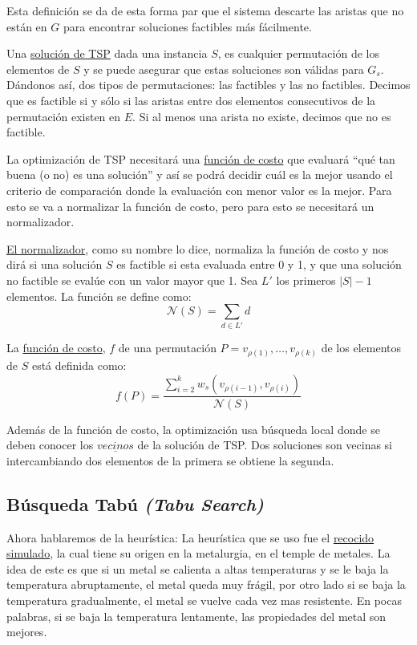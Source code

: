 \documentclass{article}
\begin{document}
Esta definición se da de esta forma par que el sistema descarte las aristas que no están en $G$ para encontrar soluciones factibles más fácilmente.

Una \underline{solución de TSP} dada una instancia $S$, es cualquier permutación de los elementos de $S$ y se puede asegurar que estas soluciones son válidas para $G_s$. Dándonos así, dos tipos de permutaciones: las factibles y las no factibles. Decimos que es factible si y sólo si las aristas entre dos elementos consecutivos de la permutación existen en $E$. Si al menos una arista no existe, decimos que no es factible.


La optimización de TSP necesitará una \underline{función de costo} que evaluará ``qué tan buena (o no) es una solución'' y así se podrá decidir cuál es la mejor usando el criterio de comparación donde la evaluación con menor valor es la mejor. Para esto se va a normalizar la función de costo, pero para esto se necesitará un normalizador.

\underline{El normalizador}, como su nombre lo dice, normaliza la función de costo y nos dirá si una solución $S$ es factible si esta evaluada entre 0 y 1, y que una solución no factible se evalúe con un valor mayor que 1. Sea $L'$ los primeros $|S|-1$ elementos. La función se define como:
\[
\mathcal{N}(S) = \sum_{d \in L'}d
\]

La \underline{función de costo}, $f$ de una permutación $P = v_{\rho(1)}, \ldots, v_{\rho(k)}$ de los elementos de $S$ está definida como:
\[
    f(P) = \frac{\sum_{i=2}^{k} w_s(v_{\rho(i-1)}, v_{\rho(i)})}{\mathcal{N}(S)}
\]

Además de la función de costo, la optimización usa búsqueda local donde se deben conocer los $\underline{vecinos}$ de la solución de TSP. Dos soluciones son vecinas si intercambiando dos elementos de la primera se obtiene la segunda.

\subsection{Búsqueda Tabú \emph{(Tabu Search)}}
Ahora hablaremos de la heurística: La heurística que se uso fue el \underline{recocido simulado}, la cual tiene su origen en la metalurgia, en el temple de metales. La idea de este es que si un metal se calienta a altas temperaturas y se le baja la temperatura abruptamente, el metal queda muy frágil, por otro lado si se baja la temperatura gradualmente, el metal se vuelve cada vez mas resistente. En pocas palabras, si se baja la temperatura lentamente, las propiedades del metal son mejores.
\end{document}
